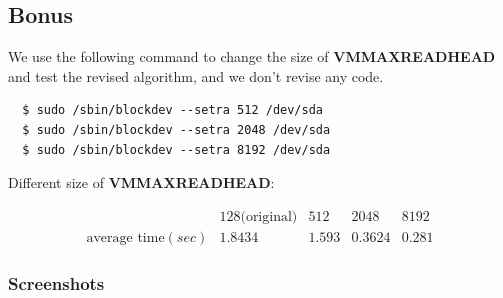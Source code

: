 \documentclass{article}
\renewcommand{\_}{\textscale{.5}{\textunderscore}}
\newcommand{\tb}{\textbf}
\begin{document}
\newpage
\subsection*{Bonus}

We use the following command to change the size of \tb{VM\_MAX\_READHEAD} and test the revised algorithm, and we don't revise any code.

\begin{lstlisting}
  $ sudo /sbin/blockdev --setra 512 /dev/sda
  $ sudo /sbin/blockdev --setra 2048 /dev/sda
  $ sudo /sbin/blockdev --setra 8192 /dev/sda
\end{lstlisting}

Different size of \tb{VM\_MAX\_READHEAD}:

$$
\begin{array}{c|c|c|c|c}
    & 128 \text{(original)} & 512 & 2048 & 8192 \\
    \hline
    \text{average time}(sec) & 1.8434 & 1.593 & 0.3624 & 0.281
\end{array}
$$

\subsubsection*{Screenshots}
\end{document}
